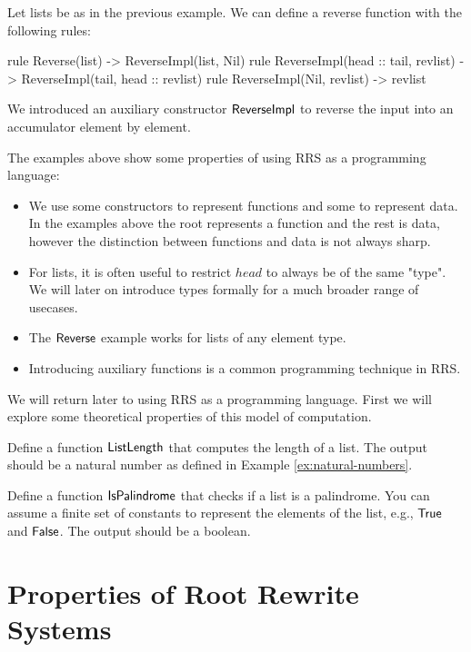\documentclass[11pt]{article}
\begin{document}
\begin{example}
Let lists be as in the previous example. We can define a reverse function with
the following rules:
\begin{rrscode}
rule Reverse(list) -> ReverseImpl(list, Nil)
rule ReverseImpl(head :: tail, revlist)
    -> ReverseImpl(tail, head :: revlist)
rule ReverseImpl(Nil, revlist) -> revlist
\end{rrscode}
We introduced an auxiliary constructor $\mathsf{ReverseImpl}$ to reverse the input
into an accumulator element by element.
\end{example}

The examples above show some properties of using RRS as a programming language:
\begin{itemize}
\item We use some constructors to represent functions and some to represent data. In the
examples above the root represents a function and the rest is data, however the
distinction between functions and data is not always sharp.
\item For lists, it is often useful to restrict $head$ to always be of the same "type".
We will later on introduce types formally for a much broader range of usecases.
\item The $\mathsf{Reverse}$ example works for lists of any element type.
\item Introducing auxiliary functions is a common programming technique in RRS.
\end{itemize}

We will return later to using RRS as a programming language. First we will explore
some theoretical properties of this model of computation.

\begin{exercise}
Define a function $\mathsf{ListLength}$ that computes the length of a list.
The output should be a natural number as defined in Example \ref{ex:natural-numbers}.
\end{exercise}

\begin{exercise}
Define a function $\mathsf{IsPalindrome}$ that checks if a list is a palindrome.
You can assume a finite set of constants to represent the elements of the list, e.g.,
$\mathsf{True}$ and $\mathsf{False}$. The output should be a boolean.
\end{exercise}

\section{Properties of Root Rewrite Systems}
\end{document}
